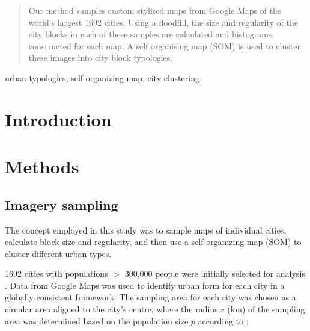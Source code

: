 \documentclass[final,3p,times,authoryear]{elsarticle}
\begin{document}
\begin{frontmatter}
\begin{abstract}
Our method samples custom stylised maps from Google Maps of the world's largest 1692 cities. Using a floodfill, the size and regularity of the city blocks in each of these samples are calculated and histograms constructed for each map. A self organising map (SOM) is used to cluster these images into city block typologies. 


\end{abstract}

\begin{keyword}
urban typologies, self organizing map, city clustering



\end{keyword}

\end{frontmatter}







\section{Introduction}\label{sec:introduction}






\section{Methods}\label{sec:Methods}

\subsection{Imagery sampling}\label{sec:methods2}
The concept employed in this study was to sample maps of individual cities, calculate block size and regularity, and then use a self organizing map (SOM) to cluster different urban types.

1692 cities with populations $>$ 300,000 people were initially selected for analysis \citep{UN2014}. Data from Google Maps was used to identify urban form for each city in a globally consistent framework. The sampling area for each city was chosen as a circular area aligned to the city's centre, where the radius $r$ (km) of the sampling area was determined based on the population size $p$ according to \citet{Barthelemy2016}: 
\end{document}
